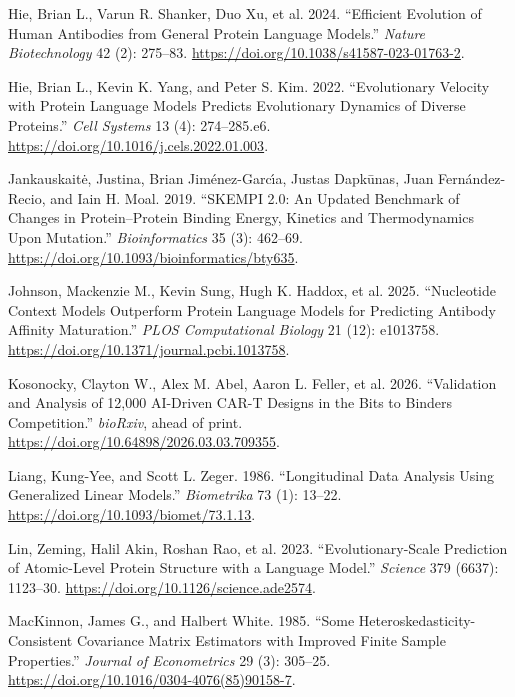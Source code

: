 \documentclass[
  11pt,
  us-letterpaper,
  DIV=11,
  numbers=noendperiod]{scrartcl}
\newlength{\cslhangindent}
\newenvironment{CSLReferences}[2] %
 {\begin{list}{}{%
  \setlength{\itemindent}{0pt}
  \setlength{\leftmargin}{0pt}
  \setlength{\parsep}{0pt}
  \ifodd #1
   \setlength{\leftmargin}{\cslhangindent}
   \setlength{\itemindent}{-1\cslhangindent}
  \fi
  \setlength{\itemsep}{#2\baselineskip}}}
 {\end{list}}
\begin{document}
\begin{CSLReferences}{1}{1}
Hie, Brian L., Varun R. Shanker, Duo Xu, et al. 2024. {``Efficient
Evolution of Human Antibodies from General Protein Language Models.''}
\emph{Nature Biotechnology} 42 (2): 275--83.
\url{https://doi.org/10.1038/s41587-023-01763-2}.

Hie, Brian L., Kevin K. Yang, and Peter S. Kim. 2022. {``Evolutionary
Velocity with Protein Language Models Predicts Evolutionary Dynamics of
Diverse Proteins.''} \emph{Cell Systems} 13 (4): 274--285.e6.
\url{https://doi.org/10.1016/j.cels.2022.01.003}.

Jankauskaitė, Justina, Brian Jiménez-Garcı́a, Justas Dapkūnas, Juan
Fernández-Recio, and Iain H. Moal. 2019. {``{SKEMPI} 2.0: An Updated
Benchmark of Changes in Protein--Protein Binding Energy, Kinetics and
Thermodynamics Upon Mutation.''} \emph{Bioinformatics} 35 (3): 462--69.
\url{https://doi.org/10.1093/bioinformatics/bty635}.

Johnson, Mackenzie M., Kevin Sung, Hugh K. Haddox, et al. 2025.
{``Nucleotide Context Models Outperform Protein Language Models for
Predicting Antibody Affinity Maturation.''} \emph{PLOS Computational
Biology} 21 (12): e1013758.
\url{https://doi.org/10.1371/journal.pcbi.1013758}.

Kosonocky, Clayton W., Alex M. Abel, Aaron L. Feller, et al. 2026.
{``Validation and Analysis of 12,000 {AI}-Driven {CAR-T} Designs in the
{Bits to Binders} Competition.''} \emph{bioRxiv}, ahead of print.
\url{https://doi.org/10.64898/2026.03.03.709355}.

Liang, Kung-Yee, and Scott L. Zeger. 1986. {``Longitudinal Data Analysis
Using Generalized Linear Models.''} \emph{Biometrika} 73 (1): 13--22.
\url{https://doi.org/10.1093/biomet/73.1.13}.

Lin, Zeming, Halil Akin, Roshan Rao, et al. 2023. {``Evolutionary-Scale
Prediction of Atomic-Level Protein Structure with a Language Model.''}
\emph{Science} 379 (6637): 1123--30.
\url{https://doi.org/10.1126/science.ade2574}.

MacKinnon, James G., and Halbert White. 1985. {``Some
Heteroskedasticity-Consistent Covariance Matrix Estimators with Improved
Finite Sample Properties.''} \emph{Journal of Econometrics} 29 (3):
305--25. \url{https://doi.org/10.1016/0304-4076(85)90158-7}.


\end{CSLReferences}
\end{document}
